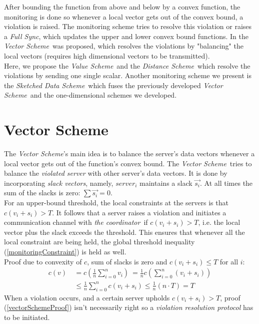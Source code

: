 \documentclass[10pt, conference]{IEEEtran}
\newcommand{\vectorScheme}{\textit{Vector Scheme}}
\newcommand{\valueScheme}{\textit{Value Scheme}}
\newcommand{\distanceScheme}{\textit{Distance Scheme}}
\newcommand{\sketchScheme}{\textit{Sketched Data Scheme}}
\newcommand{\fullSync}{\textit{Full Sync}}
\newcommand{\theCoordinator}{\textit{the coordinator}}
\begin{document}
After bounding the function from above and below by a convex function, the monitoring is done so whenever a local vector gets out of the convex bound, a violation is raised. The monitoring scheme tries to resolve this violation or raises a \fullSync , which updates the upper and lower convex bound functions.
In \cite{lazerson2018lightweight} the \vectorScheme \ was proposed, which resolves the violations by "balancing" the local vectors (requires high dimensional vectors to be transmitted). \\
Here, we propose the \valueScheme \ and the \distanceScheme \ which resolve the violations by sending one single scalar. Another monitoring scheme we present is the \sketchScheme \ which fuses the previously developed \vectorScheme \ and the one-dimensional schemes we developed.

\section{Vector Scheme}
The \vectorScheme 's main idea is to balance the server's data vectors whenever a local vector gets out of the function's convex bound. The \vectorScheme \ tries to balance the \textit{violated server} with other server's data vectors. It is done by incorporating \textit{slack vectors}, namely, $server_i$ maintains a slack $\overrightarrow{s_i}$. At all times the sum of the slacks is zero: ${\sum{\overrightarrow{s_i}} = 0}$. \\
For an upper-bound threshold, the local constraints at the servers is that ${c(v_i+s_i) > T}$. It follows that a server raises a violation and initiates a communication channel with \theCoordinator \ if ${c(v_i+s_i) > T}$, i.e. the local vector plus the slack exceeds the threshold. This ensures that whenever all the local constraint are being held, the global threshold inequality (\ref{monitoringConstraint}) is held as well.\\
Proof due to convexity of $c$, sum of slacks is zero and ${c(v_i+s_i) \leq T}$ for all $i$:
\begin{equation}
\label{vectorSchemeProof}
\begin{aligned}
 c(v)  \
	   &=  c\left(\frac{1}{n} \sum\limits_{i=0}^{n}{v_i}\right)  \
        =  \frac{1}{n} c\left(\sum\limits_{i=0}^{n}{(v_i + s_i)}\right) \\
      &\leq   \frac{1}{n} \sum\limits_{i=0}^{n}{c(v_i + s_i)}
       \leq   \frac{1}{n}(n \cdot T)
       = T
\end{aligned}
\end{equation}
When a violation occurs, and a certain server upholds ${c(v_i+s_i) > T}$, proof (\ref{vectorSchemeProof}) isn't necessarily right so a \textit{violation resolution protocol} has to be initiated.
\end{document}
